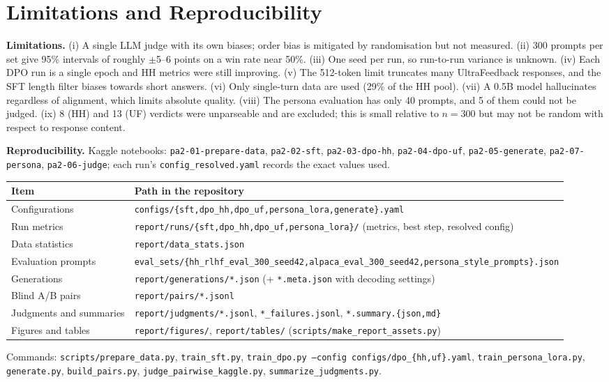 \documentclass[10pt]{article}
\begin{document}
\section{Limitations and Reproducibility}
\textbf{Limitations.} (i) A single LLM judge with its own biases; order bias is mitigated by
randomisation but not measured. (ii) 300 prompts per set give 95\% intervals of roughly
$\pm$5--6 points on a win rate near 50\%. (iii) One seed per run, so run-to-run variance is unknown.
(iv) Each DPO run is a single epoch and HH metrics were still improving. (v) The 512-token limit
truncates many UltraFeedback responses, and the SFT length filter biases towards short answers.
(vi) Only single-turn data are used (29\% of the HH pool). (vii) A 0.5B model hallucinates
regardless of alignment, which limits absolute quality. (viii) The persona evaluation has only 40
prompts, and 5 of them could not be judged. (ix) 8 (HH) and 13 (UF) verdicts were unparseable and are
excluded; this is small relative to $n=300$ but may not be random with respect to response content.

\textbf{Reproducibility.} Kaggle notebooks: \texttt{pa2-01-prepare-data}, \texttt{pa2-02-sft},
\texttt{pa2-03-dpo-hh}, \texttt{pa2-04-dpo-uf}, \texttt{pa2-05-generate}, \texttt{pa2-07-persona},
\texttt{pa2-06-judge}; each run's \texttt{config\_resolved.yaml} records the exact values used.
\begin{center}\footnotesize
\begin{tabular}{@{}ll@{}}
\toprule
Item & Path in the repository \\
\midrule
Configurations & \texttt{configs/\{sft,dpo\_hh,dpo\_uf,persona\_lora,generate\}.yaml} \\
Run metrics & \texttt{report/runs/\{sft,dpo\_hh,dpo\_uf,persona\_lora\}/} (metrics, best step, resolved config) \\
Data statistics & \texttt{report/data\_stats.json} \\
Evaluation prompts & \texttt{eval\_sets/\{hh\_rlhf\_eval\_300\_seed42,alpaca\_eval\_300\_seed42,persona\_style\_prompts\}.json} \\
Generations & \texttt{report/generations/*.json} (+ \texttt{*.meta.json} with decoding settings) \\
Blind A/B pairs & \texttt{report/pairs/*.jsonl} \\
Judgments and summaries & \texttt{report/judgments/*.jsonl}, \texttt{*\_failures.jsonl}, \texttt{*.summary.\{json,md\}} \\
Figures and tables & \texttt{report/figures/}, \texttt{report/tables/} (\texttt{scripts/make\_report\_assets.py}) \\
\bottomrule
\end{tabular}
\end{center}
Commands: \texttt{scripts/prepare\_data.py}, \texttt{train\_sft.py}, \texttt{train\_dpo.py --config
configs/dpo\_\{hh,uf\}.yaml}, \texttt{train\_persona\_lora.py}, \texttt{generate.py},
\texttt{build\_pairs.py}, \texttt{judge\_pairwise\_kaggle.py}, \texttt{summarize\_judgments.py}.
\end{document}
